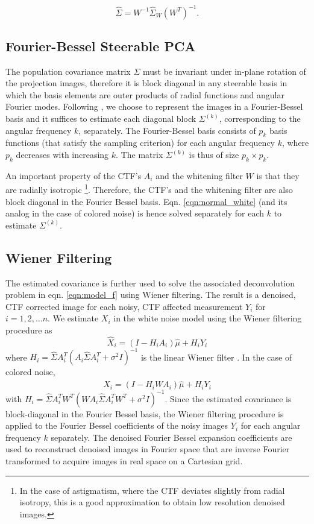 \begin{equation}
\hat{\Sigma} = W^{-1} \hat{\Sigma}_W (W^T)^{-1} .
\end{equation}


\subsection{Fourier-Bessel Steerable PCA}
\label{sec:fb_basis}
The population covariance matrix $\Sigma$ must be invariant under in-plane 
rotation of the projection images, therefore it is block diagonal in any steerable basis in which the 
basis elements are outer products of radial functions and angular Fourier modes. 
Following \cite{Zhao1}, we 
choose to represent the images in a Fourier-Bessel basis and it suffices to 
estimate each diagonal block $\Sigma^{(k)}$, corresponding to the angular frequency $k$, separately. 
The Fourier-Bessel basis \cite{Zhao1, Zhao2016} consists of $p_k$ basis functions (that satisfy
the sampling criterion) for each angular frequency $k$, where $p_k$ decreases with increasing $k$.
The matrix $\Sigma^{(k)}$ is thus of size $p_k \times p_k$.

An important property
of the CTF's $A_i$ and the whitening filter $W$ is that they are radially isotropic \footnote{In the case of
astigmatism, where the CTF deviates slightly from radial isotropy, this is a 
good approximation to obtain low resolution
denoised images.}. 
Therefore, the CTF's and the whitening filter
are also block diagonal in the Fourier Bessel basis. Eqn. 
\ref{eqn:normal_white} (and its analog in the case of colored noise)
is hence solved separately for each $k$ to estimate $\Sigma^{(k)}$.



\subsection{Wiener Filtering}
\label{sec:wf}
The estimated covariance is
further used to solve the associated deconvolution problem
in eqn. \ref{eqn:model_f} using Wiener filtering. The result is a denoised, CTF 
corrected image for each noisy, CTF affected
measurement $Y_i$ for $i=1,2,\ldots n$. We
estimate $X_i$ in the white noise model using the Wiener 
filtering procedure as
\begin{equation}
\hat X_i = (I-H_iA_{i})\hat\mu + H_iY_i 
\end{equation}
where $H_i = \hat \Sigma A_{i}^T ( A_{i} \hat \Sigma A_{i}^T + \sigma^2 
I)^{-1} $ is the linear Wiener filter \cite{wiener_deriv}. In the case of colored noise,
\begin{equation}
\hat X_i = (I-H_iWA_{i})\hat\mu + H_iY_i 
\end{equation}
with $H_i = \hat \Sigma A_{i}^T W^T (W A_{i} \hat \Sigma A_{i}^T W^T 
+ \sigma^2 I)^{-1}$. Since the estimated covariance
is block-diagonal in the Fourier Bessel basis, the Wiener filtering
procedure is applied to the Fourier Bessel coefficients of the noisy 
images $Y_i$ for each angular frequency $k$ separately. The denoised 
Fourier Bessel expansion coefficients
are used to reconstruct denoised images in Fourier space that are inverse Fourier 
transformed to acquire images in real space on a Cartesian grid.

